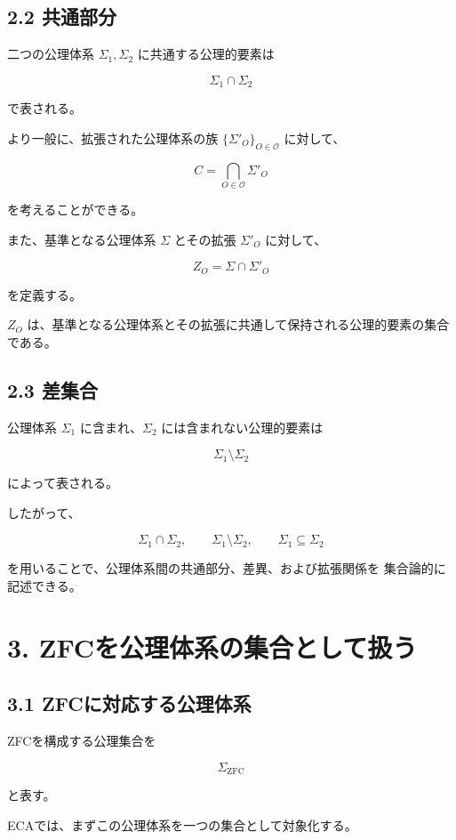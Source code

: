 \documentclass[11pt]{article}
\begin{document}
\subsection{2.2 共通部分}

二つの公理体系 $\Sigma_1,\Sigma_2$ に共通する公理的要素は

\[
\Sigma_1\cap\Sigma_2
\]

で表される。

より一般に、拡張された公理体系の族
$\{\Sigma'_O\}_{O\in\mathcal{O}}$ に対して、

\[
C=\bigcap_{O\in\mathcal{O}}\Sigma'_O
\]

を考えることができる。

また、基準となる公理体系 $\Sigma$ とその拡張 $\Sigma'_O$ に対して、

\[
Z_O=\Sigma\cap\Sigma'_O
\]

を定義する。

$Z_O$ は、基準となる公理体系とその拡張に共通して保持される公理的要素の集合である。

\subsection{2.3 差集合}

公理体系 $\Sigma_1$ に含まれ、$\Sigma_2$ には含まれない公理的要素は

\[
\Sigma_1\setminus\Sigma_2
\]

によって表される。

したがって、

\[
\Sigma_1\cap\Sigma_2,\qquad
\Sigma_1\setminus\Sigma_2,\qquad
\Sigma_1\subseteq\Sigma_2
\]

を用いることで、公理体系間の共通部分、差異、および拡張関係を
集合論的に記述できる。

\section{3. ZFCを公理体系の集合として扱う}

\subsection{3.1 ZFCに対応する公理体系}

ZFCを構成する公理集合を

\[
\Sigma_{\mathrm{ZFC}}
\]

と表す。

ECAでは、まずこの公理体系を一つの集合として対象化する。
\end{document}
